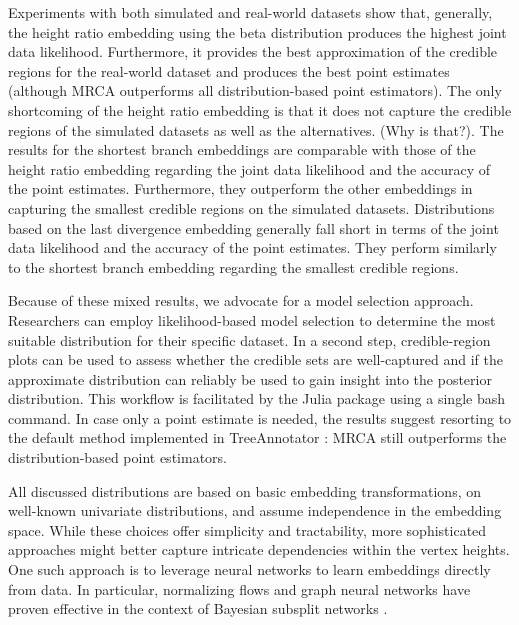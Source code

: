 \documentclass[10pt,letterpaper]{article}
\begin{document}
Experiments with both simulated and real-world datasets show that, generally, the height ratio embedding using the beta distribution produces the highest joint data likelihood. Furthermore, it provides the best approximation of the credible regions for the real-world dataset and produces the best point estimates (although MRCA outperforms all distribution-based point estimators). The only shortcoming of the height ratio embedding is that it does not capture the credible regions of the simulated datasets as well as the alternatives. (Why is that?). The results for the shortest branch embeddings are comparable with those of the height ratio embedding regarding the joint data likelihood and the accuracy of the point estimates. Furthermore, they outperform the other embeddings in capturing the smallest credible regions on the simulated datasets. Distributions based on the last divergence embedding generally fall short in terms of the joint data likelihood and the accuracy of the point estimates. They perform similarly to the shortest branch embedding regarding the smallest credible regions.

Because of these mixed results, we advocate for a model selection approach. Researchers can employ likelihood-based model selection to determine the most suitable distribution for their specific dataset. In a second step, credible-region plots can be used to assess whether the credible sets are well-captured and if the approximate distribution can reliably be used to gain insight into the posterior distribution. This workflow is facilitated by the Julia package using a single bash command. In case only a point estimate is needed, the results suggest resorting to the default method implemented in TreeAnnotator \cite{treeannotator}: MRCA still outperforms the distribution-based point estimators.

All discussed distributions are based on basic embedding transformations, on well-known univariate distributions, and assume independence in the embedding space. While these choices offer simplicity and tractability, more sophisticated approaches might better capture intricate dependencies within the vertex heights. One such approach is to leverage neural networks to learn embeddings directly from data. In particular, normalizing flows \cite{normalizingflow} and graph neural networks \cite{graphnn} have proven effective in the context of Bayesian subsplit networks \cite{subsplitnf,artree}.
\end{document}
